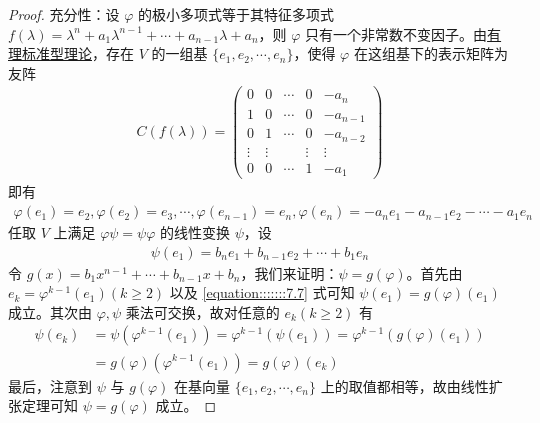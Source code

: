 \documentclass[../../main.tex]{subfiles}
\begin{document}
\begin{proof}
{\heiti 充分性：}设 $\varphi$ 的极小多项式等于其特征多项式 $f(\lambda)=\lambda^n + a_1\lambda^{n - 1}+\cdots + a_{n - 1}\lambda + a_n$，则 $\varphi$ 只有一个非常数不变因子。由\hyperref[theorem:有理标准型核心定理]{有理标准型理论}，存在 $V$ 的一组基 $\{e_1,e_2,\cdots,e_n\}$，使得 $\varphi$ 在这组基下的表示矩阵为友阵
\begin{align*}
C(f(\lambda))=\begin{pmatrix}
0 & 0 & \cdots & 0 & -a_n \\
1 & 0 & \cdots & 0 & -a_{n - 1} \\
0 & 1 & \cdots & 0 & -a_{n - 2} \\
\vdots & \vdots & & \vdots & \vdots \\
0 & 0 & \cdots & 1 & -a_1
\end{pmatrix}
\end{align*}
即有
\begin{align*}
\varphi(e_1)=e_2,\varphi(e_2)=e_3,\cdots,\varphi(e_{n - 1})=e_n,\varphi(e_n)=-a_ne_1 - a_{n - 1}e_2 - \cdots - a_1e_n
\end{align*}
任取 $V$ 上满足 $\varphi\psi = \psi\varphi$ 的线性变换 $\psi$，设
\begin{align}
\psi(e_1)=b_ne_1 + b_{n - 1}e_2 + \cdots + b_1e_n\label{equation:::::::7.7}
\end{align}
令 $g(x)=b_1x^{n - 1}+\cdots + b_{n - 1}x + b_n$，我们来证明：$\psi = g(\varphi)$。首先由 $e_k=\varphi^{k - 1}(e_1)(k\geqslant  2)$ 以及 \eqref{equation:::::::7.7} 式可知 $\psi(e_1)=g(\varphi)(e_1)$ 成立。其次由 $\varphi,\psi$ 乘法可交换，故对任意的 $e_k(k\geqslant  2)$ 有
\begin{align*}
\psi(e_k)&=\psi(\varphi^{k - 1}(e_1))=\varphi^{k - 1}(\psi(e_1))=\varphi^{k - 1}(g(\varphi)(e_1))\\
&=g(\varphi)(\varphi^{k - 1}(e_1))=g(\varphi)(e_k)
\end{align*}
最后，注意到 $\psi$ 与 $g(\varphi)$ 在基向量 $\{e_1,e_2,\cdots,e_n\}$ 上的取值都相等，故由线性扩张定理可知 $\psi = g(\varphi)$ 成立。


\end{proof}
\end{document}
